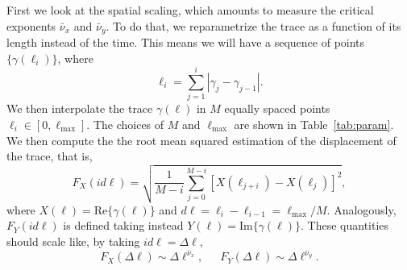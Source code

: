 First we look at the spatial scaling, which amounts to measure the critical
exponents $\bar{\nu}_x$ and $\bar{\nu}_y$. To do that, we reparametrize the
trace as a function of its length instead of the time. This means we will have
a sequence of points $\{\gamma(\ell_i)\}$, where
\begin{equation}
    \ell_i = \sum_{j=1}^i \left|\gamma_j-\gamma_{j-1}\right|.
\end{equation}
We then interpolate the trace $\gamma(\ell)$ in $M$ equally spaced points
$\ell_i\in[0,\ell_{\max}]$. The choices of $M$ and $\ell_{\max}$ are shown in
Table~\ref{tab:param}. We then compute the the root mean squared estimation of
the displacement of the trace, that is,
\begin{equation}
    \label{eq:correl}
    F_X(id\ell) = \sqrt{\frac{1}{M-i}
    \sum_{j=0}^{M-i}{[X(\ell_{j+i}) - X(\ell_j)]}^2 },
\end{equation}
where $X(\ell) = \mbox{Re}\{\gamma(\ell)\}$ and $d\ell=\ell_i-\ell_{i-1}=\ell_{\max}/M$.
Analogously, $F_Y(id\ell)$ is defined taking instead
$Y(\ell)=\mbox{Im}\{\gamma(\ell)\}$. These quantities should scale like, by taking
$id\ell=\Delta\ell$,
\begin{equation}
    F_{X}\left(\Delta\ell\right)\sim\Delta\ell^{\bar{\nu}_{x}},
    \,\,\,\,\,\,\,\,\,
    F_{Y}\left(\Delta\ell\right)\sim\Delta\ell^{\bar{\nu}_{y}}.
\end{equation}

